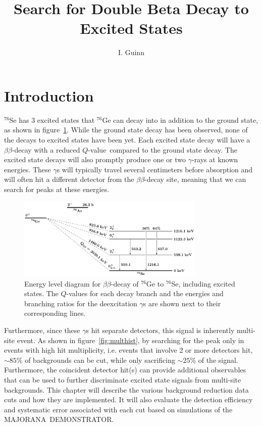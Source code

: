 \documentclass[notitlepage,rmp,aps,10pt]{revtex4-1}
\newcommand{\MJ}{M{\footnotesize AJORANA}}
\newcommand{\Demo}{D{\footnotesize EMON\-STRAT\-OR}}
\newcommand{\MJD}{\MJ\ \Demo}
\newcommand{\bb}{${\beta \beta}$}
\newcommand{\Qval}{$Q$-value}
\newcommand{\iso}[2]{$^{#1}$#2}
\newcommand{\Ge}[1]{\iso{#1}{Ge}}
\newcommand{\Se}[1]{\iso{#1}{Se}}
\newcommand{\msmd}{multi-site event}
\begin{document}
\graphicspath{{./pics/}{../appBlindResults/pics/}{../ch3/pics/}{../ch4/pics/}{../ch5/pics/}{../appSens/pics/}}

\title{Search for Double Beta Decay to Excited States}
\author{I. Guinn}

\pagestyle{uniheader}
\maketitle
\vspace*{-1.5cm}
\tableofcontents
\thispagestyle{uniheader}

\section{Introduction}
\Se{76} has 3 excited states that \Ge{76} can decay into in addition to the ground state, as shown in figure~\ref{fig:Ge76BBLevelDiagram}.
While the ground state decay has been observed, none of the decays to excited states have been yet.
Each excited state decay will have a \bb -decay with a reduced \Qval\ compared to the ground state decay.
The excited state decays will also promptly produce one or two $\gamma$-rays at known energies.
These $\gamma$s will typically travel several centimeters before absorption and will often hit a different detector from the \bb -decay site, meaning that we can search for peaks at these energies.
\\
\begin{figure}[h]
  \centering
  \includegraphics[width=0.8\textwidth]{leveldiagram}
  \caption[Energy level diagram for \Ge{76} \bb to \Se{76}]{\label{fig:Ge76BBLevelDiagram}
    Energy level diagram for \bb-decay of \Ge{76} to \Se{76}, including excited states. The \Qval s for each decay branch and the energies and branching ratios for the deexcitation $\gamma$s are shown next to their corresponding lines.
  }
\end{figure}


Furthermore, since these $\gamma$s hit separate detectors, this signal is inherently \msmd.
As shown in figure~\ref{fig:multhist}, by searching for the peak only in events with high hit multiplicity, i.e. events that involve 2 or more detectors hit, $\sim85\%$ of backgrounds can be cut, while only sacrificing $\sim25$\% of the signal.
Furthermore, the coincident detector hit(s) can provide additional observables that can be used to further discriminate excited state signals from multi-site backgrounds.
This chapter will describe the various background reduction data cuts and how they are implemented.
It will also evaluate the detection efficiency and systematic error associated with each cut based on simulations of the \MJD.
\end{document}

